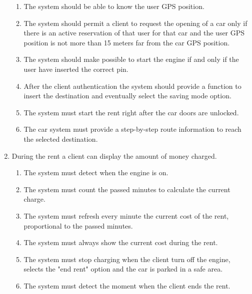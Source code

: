 \begin{enumerate}
\begin{enumerate}
\item The system should be able to know the user GPS position.
\item The system should permit a client to request the opening of a car only if there is an active reservation of that user for that car and the user GPS position is not more than 15 meters far from the car GPS position.
\item The system should make possible to start the engine if and only if the user have inserted the correct pin.
\item After the client authentication the system should provide a function to insert the destination and eventually select the saving mode option.
\item The system must start the rent right after the car doors are unlocked.
\item The car system must provide a step-by-step route information to reach the selected destination.
\end{enumerate}

\item During the rent a client can display the amount of money charged.
\begin{enumerate}
\item The system must detect when the engine is on.
\item The system must count the passed minutes to calculate the current charge.
\item The system must refresh every minute the current cost of the rent, proportional to the passed minutes.
\item The system must always show the current cost during the rent.
\item The system must stop charging when the client turn off the engine, selects the "end rent" option and the car is parked in a safe area.
\item The system must detect the moment when the client ends the rent.
\end{enumerate}


\end{enumerate}
